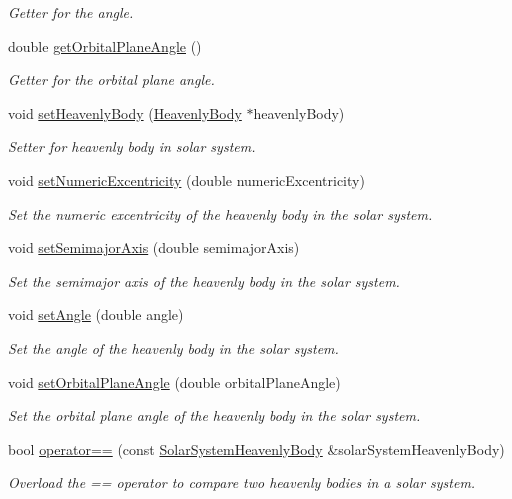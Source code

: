 \begin{DoxyCompactItemize}
\begin{DoxyCompactList}\small\item\em \-Getter for the angle. \end{DoxyCompactList}\item 
double \hyperlink{classSolarSystemHeavenlyBody_a498b595f26b3e4086f81ba76d1e2908c}{get\-Orbital\-Plane\-Angle} ()
\begin{DoxyCompactList}\small\item\em \-Getter for the orbital plane angle. \end{DoxyCompactList}\item 
void \hyperlink{classSolarSystemHeavenlyBody_af9203ede3fa3e3b80679e88e50e4237a}{set\-Heavenly\-Body} (\hyperlink{classHeavenlyBody}{\-Heavenly\-Body} $\ast$heavenly\-Body)
\begin{DoxyCompactList}\small\item\em \-Setter for heavenly body in solar system. \end{DoxyCompactList}\item 
void \hyperlink{classSolarSystemHeavenlyBody_ac6d51045bf0ae5bd676a31f310f757bf}{set\-Numeric\-Excentricity} (double numeric\-Excentricity)
\begin{DoxyCompactList}\small\item\em \-Set the numeric excentricity of the heavenly body in the solar system. \end{DoxyCompactList}\item 
void \hyperlink{classSolarSystemHeavenlyBody_a009c8b119d34d6f8654b3452d8fbd464}{set\-Semimajor\-Axis} (double semimajor\-Axis)
\begin{DoxyCompactList}\small\item\em \-Set the semimajor axis of the heavenly body in the solar system. \end{DoxyCompactList}\item 
void \hyperlink{classSolarSystemHeavenlyBody_a9090ebb05d92989f60c88a7c4f56cbb8}{set\-Angle} (double angle)
\begin{DoxyCompactList}\small\item\em \-Set the angle of the heavenly body in the solar system. \end{DoxyCompactList}\item 
void \hyperlink{classSolarSystemHeavenlyBody_a4a0e36997ff3c47d15a2623689489252}{set\-Orbital\-Plane\-Angle} (double orbital\-Plane\-Angle)
\begin{DoxyCompactList}\small\item\em \-Set the orbital plane angle of the heavenly body in the solar system. \end{DoxyCompactList}\item 
bool \hyperlink{classSolarSystemHeavenlyBody_a5f34a6913ef4b3266141ef5dc4a39b46}{operator==} (const \hyperlink{classSolarSystemHeavenlyBody}{\-Solar\-System\-Heavenly\-Body} \&solar\-System\-Heavenly\-Body)
\begin{DoxyCompactList}\small\item\em \-Overload the == operator to compare two heavenly bodies in a solar system. \end{DoxyCompactList}\end{DoxyCompactItemize}


